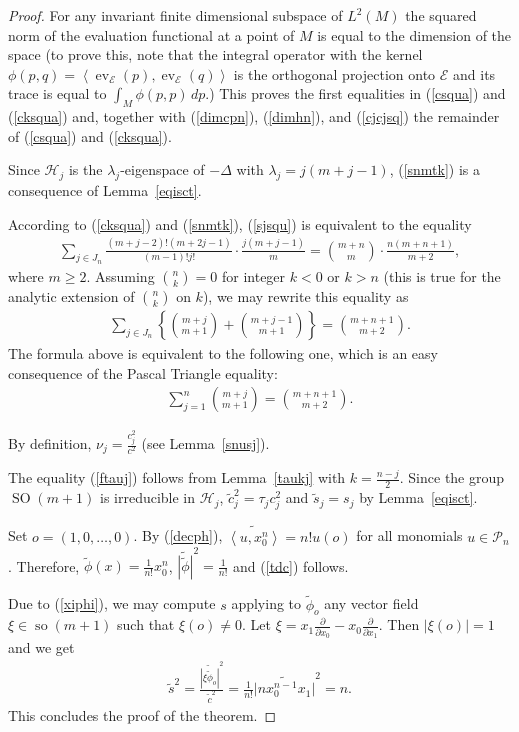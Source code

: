 \documentclass[10pt]{amsart}
\theoremstyle{remark}
\let\td=\tilde
\let\wtd=\widetilde
\begin{document}
\begin{proof}
For any invariant finite dimensional subspace of $L^2(M)$ the
squared norm of the evaluation functional at a point of $M$ is
equal to the dimension of the space (to prove this, note that the
integral operator with the kernel
$\phi(p,q)={\left<{{\mathop{\mathrm{ev}}\nolimits}_{\mathcal{E}}(p)},{{\mathop{\mathrm{ev}}\nolimits}_{\mathcal{E}}(q)}\right>}$ is the orthogonal
projection onto ${\mathcal{E}}$ and its trace is equal to
$\int_M\phi(p,p)\,dp$.) This proves the first equalities in
(\ref{csqua}) and (\ref{cksqua}) and, together with
(\ref{dimcpn}), (\ref{dimhn}), and (\ref{cjcjsq}) the remainder of
(\ref{csqua}) and (\ref{cksqua}).

Since ${\mathcal{H}}_j$ is the ${{\mathord{\lambda}}}_j$-eigenspace of $-{{\mathord{\Delta}}}$ with
${{\mathord{\lambda}}}_j=j(m+j-1)$, (\ref{snmtk}) is a consequence of
Lemma~\ref{eqisct}.

According to (\ref{cksqua}) and (\ref{snmtk}), (\ref{sjsqu}) is
equivalent to the equality
\begin{eqnarray*}
\sum_{j\in J_n}\frac{(m+j-2)!(m+2j-1)}{(m-1)!j!} \cdot
\frac{j(m+j-1)}{m}= {{m+n}\choose{m}}\cdot \frac{n(m+n+1)}{m+2},
\end{eqnarray*}
where $m\geq2$. Assuming ${n\choose k}=0$ for integer $k<0$ or
$k>n$ (this is true for the analytic extension of ${n\choose k}$
on $k$), we may rewrite this equality as
\begin{eqnarray*}
\sum_{j\in J_n}
\left\{{m+j\choose{m+1}}+{m+j-1\choose{m+1}}\right\}=
{m+n+1\choose{m+2}}.
\end{eqnarray*}
The formula above is equivalent to the following one, which is an
easy consequence of the Pascal Triangle equality:
\begin{eqnarray*}
\sum_{j=1}^n{{m+j}\choose{m+1}}={m+n+1\choose{m+2}}.
\end{eqnarray*}

By definition, $\nu_j=\frac{c_j^2}{c^2}$ (see Lemma~\ref{snusj}).

The equality (\ref{ftauj}) follows from  Lemma~\ref{taukj} with
$k=\frac{n-j}{2}$.  Since the group ${\mathop{\mathrm{SO}}}(m+1)$ is irreducible in
${\mathcal{H}}_j$, $\td c_j^2=\tau_j c_j^2$ and $\td s_j=s_j$ by
Lemma~\ref{eqisct}.

Set $o=(1,0,\dots,0)$. By (\ref{decph}),
$\wtd{{\left<{u},{x_0^n}\right>}}=n!u(o)$ for all monomials $u\in{\mathcal{P}}_n$.
Therefore, $\td\phi(x)=\frac1{n!}x_0^n$,
$\wtd{|\td\phi|}^2=\frac1{n!}$ and (\ref{tdc}) follows.

Due to (\ref{xiphi}), we may compute $s$ applying to $\td \phi_o$ any
vector field $\xi\in{\mathop{\mathrm{so}}}(m+1)$ such that $\xi(o)\neq 0$. Let
$\xi=x_1\frac{\partial}{\partial x_0}-x_0\frac{\partial}{\partial
x_1}$. Then $|\xi(o)|=1$ and we get
\begin{eqnarray}\label{prtds}
\td s^2=\frac{\wtd{|\xi\td\phi_o|}^2}{\td c^2}
=\frac1{n!}\wtd{\big|nx_0^{n-1}x_1\big|}^2 =n.
\end{eqnarray}
This concludes the proof of the theorem.
\end{proof}
\end{document}
